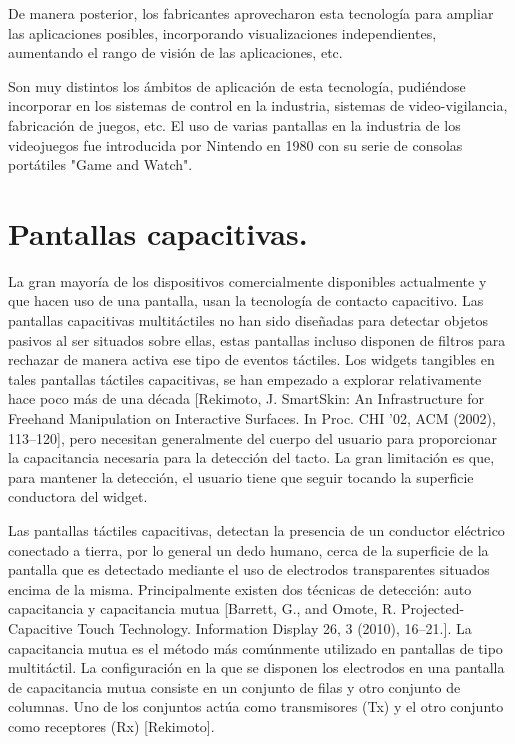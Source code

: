 De manera posterior, los fabricantes aprovecharon esta tecnología para ampliar las aplicaciones posibles, incorporando visualizaciones independientes, aumentando el rango de visión de las aplicaciones, etc.

Son muy distintos los ámbitos de aplicación de esta tecnología, pudiéndose incorporar en los sistemas de control en la industria, sistemas de video-vigilancia, fabricación de juegos, etc.
El uso de varias pantallas en la industria de los videojuegos fue introducida por Nintendo en 1980 con su serie de consolas portátiles "Game and Watch".


\section{Pantallas capacitivas.}
La gran mayoría de los dispositivos comercialmente disponibles actualmente y que hacen uso de una pantalla, usan la tecnología de contacto capacitivo.
Las pantallas capacitivas multitáctiles no han sido diseñadas para detectar objetos pasivos al ser situados sobre ellas, estas pantallas incluso disponen de filtros para rechazar de manera activa ese tipo de eventos táctiles.
Los widgets tangibles en tales pantallas táctiles capacitivas, se han empezado a explorar relativamente hace poco más de una década [Rekimoto, J. SmartSkin: An Infrastructure for Freehand Manipulation on Interactive Surfaces. In Proc. CHI ’02, ACM (2002), 113–120], pero necesitan generalmente del cuerpo del usuario para proporcionar la capacitancia necesaria para la detección del tacto. La gran limitación es que, para mantener la detección, el usuario tiene que seguir tocando la superficie conductora del widget.

Las pantallas táctiles capacitivas, detectan la presencia de un conductor eléctrico conectado a tierra, por lo general un dedo humano, cerca de la superficie de la pantalla que es detectado mediante el uso de electrodos transparentes situados encima de la misma.
Principalmente existen dos técnicas de detección: auto capacitancia y capacitancia mutua [Barrett, G., and Omote, R. Projected-Capacitive Touch Technology. Information Display 26, 3 (2010), 16–21.]. La capacitancia mutua es el método más comúnmente utilizado en pantallas de tipo multitáctil.
La configuración en la que se disponen los electrodos en una pantalla de capacitancia mutua consiste en un conjunto de filas y otro conjunto de columnas. Uno de los conjuntos actúa como transmisores (Tx) y el otro conjunto como receptores (Rx) [Rekimoto].

